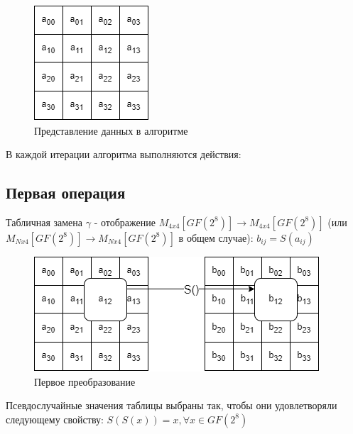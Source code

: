 \documentclass[12pt]{article}
\begin{document}

\begin{figure}[h]
    \centering
    \includegraphics[width=0.18\linewidth]{matrix.png}
    \caption{Представление данных в алгоритме}
    \label{fig:scheme}
\end{figure}
\newline
В каждой итерации алгоритма выполняются действия:

\subsection{Первая операция}
Табличная замена $\gamma$ - отображение $M_{4x4}[GF(2^{8})] \to M_{4x4}[GF(2^{8})]$ (или $M_{Nx4}[GF(2^{8})] \to M_{Nx4}[GF(2^{8})]$ в общем случае): \newline
$b_{ij} = S(a_{ij})$

\begin{figure}[h]
    \centering
    \includegraphics[width=0.4\linewidth]{first_function.png}
    \caption{Первое преобразование}
    \label{fig:scheme}
\end{figure}
\newline
Псевдослучайные значения таблицы выбраны так, чтобы они удовлетворяли следующему свойству:
$S(S(x)) = x, \forall x \in GF(2^{8})$

\end{document}
